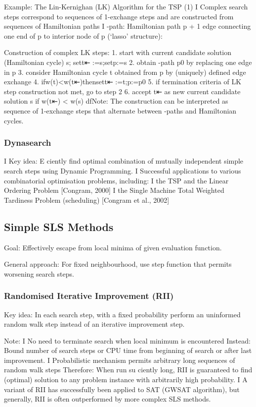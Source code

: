 \documentclass[a4paper,10pt]{article}
\begin{document}
Example: The Lin-Kernighan (LK) Algorithm for the TSP (1)
I Complex search steps correspond to sequences of 1-exchange steps and are constructed from sequences of Hamiltonian paths
I  -path: Hamiltonian path p + 1 edge connecting one end of p to interior node of p (‘lasso’ structure):


Construction of complex LK steps:
1. start with current candidate solution (Hamiltonian cycle) s; sett⇤ :=s;setp:=s
2. obtain  -path p0 by replacing one edge in p
3. consider Hamiltonian cycle t obtained from p by
(uniquely) defined edge exchange
4. ifw(t)<w(t⇤)thensett⇤ :=t;p:=p0
5. if termination criteria of LK step construction not met, go to step 2
6. accept t⇤ as new current candidate solution s if w(t⇤) < w(s)
dfNote: The construction can be interpreted as sequence of 1-exchange steps that alternate between  -paths and Hamiltonian cycles.


\subsubsection{Dynasearch}
I Key idea: E ciently find optimal combination of mutually independent simple search steps using Dynamic Programming.
I Successful applications to various combinatorial optimisation problems, including:
I the TSP and the Linear Ordering Problem [Congram, 2000] I the Single Machine Total Weighted Tardiness Problem
(scheduling) [Congram et al., 2002]

	\subsection{Simple SLS Methods}
	
Goal:
Effectively escape from local minima of given evaluation function.

General approach:
For fixed neighbourhood, use step function that permits worsening search steps.


	\subsubsection{Randomised Iterative Improvement (RII)}
Key idea: In each search step, with a fixed probability perform an uninformed random walk step instead of an iterative improvement step.

Note:
I No need to terminate search when local minimum is encountered
Instead: Bound number of search steps or CPU time from beginning of search or after last improvement.
I Probabilistic mechanism permits arbitrary long sequences of random walk steps
Therefore: When run su ciently long, RII is guaranteed to find (optimal) solution to any problem instance with arbitrarily high probability.
I A variant of RII has successfully been applied to SAT (GWSAT algorithm), but generally, RII is often outperformed by more complex SLS methods.
\end{document}

